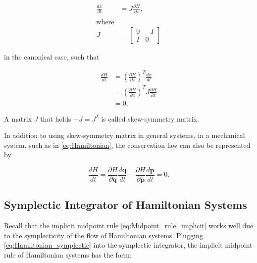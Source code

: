 \documentclass[
	parskip, 			   %
	twoside, 			   %
	DIV=14, 			   %
	BCOR=15.0mm, 		   %
	headsepline, 		   %
	open=right, 		   %
	captions=tableheading, %
	bibliography=totoc,    %
	numbers=noenddot       %
]{scrreprt}
\begin{document}
\begin{equation}
    \label{eq:Hamiltonian_symplectic}
    \begin{aligned}
        \frac{dx}{dt} &= J \frac{\partial H}{\partial x},\\\\
        \text{where}\\
        J &= \left[ \begin{array}{cc}
            0 & -I \\
            I & 0
        \end{array} \right]
    \end{aligned}
\end{equation}

in the canonical case, such that 

\begin{equation}
    \label{eq:Hamiltonian_symplectic_conclusion}
    \begin{aligned}
        \frac{dH}{dt} &= (\frac{\partial H}{\partial x})^T \frac{dx}{dt}\\
         &= (\frac{\partial H}{\partial x})^T J \frac{\partial H}{\partial x} \\
         &= 0.
    \end{aligned}
\end{equation}

A matrix $J$ that holds $-J = J^T$ is called skew-symmetry matrix.

In addition to using skew-symmetry matrix in general systems, in a mechanical system, such as in \ref{eq:Hamiltonian}, the conservation law can also be represented by

\begin{equation}
    \label{eq:Hamiltonian_invariant_in_mechaniacal_system}
    \frac{dH}{dt} = \frac{\partial H}{\partial \mathbf{q}} \frac{d \mathbf{q}}{dt} + \frac{\partial H}{\partial \mathbf{p}} \frac{d \mathbf{p}}{dt} = 0.
\end{equation}

\subsection{Symplectic Integrator of Hamiltonian Systems}
Recall that the implicit midpoint rule \ref{eq:Midpoint_rule_implicit} works well due to the symplecticity of the flow of Hamiltonian systems. Plugging \ref{eq:Hamiltonian_symplectic} into the symplectic integrator, the implicit midpoint rule of Hamiltonian systems has the form:
\end{document}
